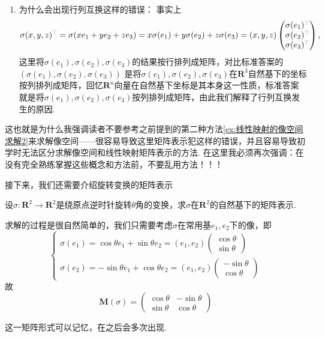 \begin{enumerate}
    \item 为什么会出现行列互换这样的错误：
          事实上
          \[
            \sigma(x,y,z)^{\color{lightgray}\mathrm{T}}
            =\sigma(xe_1+ye_2+ze_3)
            =x\sigma(e_1)+y\sigma(e_2)+z\sigma(e_3)
            =(x,y,z)
            \begin{pmatrix}
                \sigma(e_1)^{\color{lightgray}\mathrm{T}} \\
                \sigma(e_2)^{\color{lightgray}\mathrm{T}} \\
                \sigma(e_3)^{\color{lightgray}\mathrm{T}}
            \end{pmatrix},
          \]
        这里将$\sigma(e_1),\sigma(e_2),\sigma(e_3)$的结果按行排列成矩阵，对比标准答案的 $(\sigma(e_1), \sigma(e_2), \sigma(e_3))$ 是将$\sigma(e_1),\sigma(e_2),\sigma(e_3)$在$\mathbf{R}^3$自然基下的坐标按列排列成矩阵，回忆$\mathbf{R}^n$向量在自然基下坐标是其本身这一性质，标准答案就是将$\sigma(e_1),\sigma(e_2),\sigma(e_3)$按列排列成矩阵，由此我们解释了行列互换发生的原因.
\end{enumerate}

这也就是为什么我强调读者不要参考之前提到的第二种方法\autoref{ex:线性映射的像空间求解2}来求解像空间——很容易导致这里矩阵表示犯这样的错误，并且容易导致初学时无法区分求解像空间和线性映射矩阵表示的方法. 在这里我必须再次强调：在没有完全熟练掌握这些概念和方法前，不要乱用方法！！！

接下来，我们还需要介绍旋转变换的矩阵表示
\begin{example}{}{}
    设$\sigma\colon\mathbf{R}^2\to\mathbf{R}^2$是绕原点逆时针旋转$\theta$角的变换，求$\sigma$在$\mathbf{R}^2$的自然基下的矩阵表示.
\end{example}
\begin{solution}
    求解的过程是很自然简单的，我们只需要考虑$\sigma$在常用基$e_1,e_2$下的像，即
    \[
    \begin{cases}
        \sigma(e_1)=\cos\theta e_1+\sin\theta e_2=(e_1,e_2)\begin{pmatrix}
            \cos\theta \\ \sin\theta
        \end{pmatrix} \\
        \sigma(e_2)=-\sin\theta e_1+\cos\theta e_2=(e_1,e_2)\begin{pmatrix}
            -\sin\theta \\ \cos\theta
        \end{pmatrix}
    \end{cases}
    \]
    故
    \[\mathbf{M}(\sigma)=\begin{pmatrix}
        \cos\theta & -\sin\theta \\
        \sin\theta & \cos\theta
    \end{pmatrix}\]

\end{solution}
这一矩阵形式可以记忆，在之后会多次出现.

